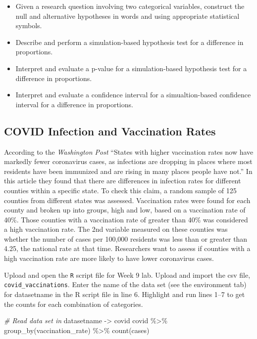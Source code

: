 \documentclass[
]{report}
\newenvironment{Shaded}{\begin{snugshade}}{\end{snugshade}}
\newcommand{\CommentTok}[1]{\textcolor[rgb]{0.56,0.35,0.01}{\textit{#1}}}
\newcommand{\FunctionTok}[1]{\textcolor[rgb]{0.00,0.00,0.00}{#1}}
\newcommand{\NormalTok}[1]{#1}
\newcommand{\OtherTok}[1]{\textcolor[rgb]{0.56,0.35,0.01}{#1}}
\newcommand{\SpecialCharTok}[1]{\textcolor[rgb]{0.00,0.00,0.00}{#1}}
\begin{document}
\begin{itemize}
\item
  Given a research question involving two categorical variables, construct the null and alternative hypotheses
  in words and using appropriate statistical symbols.
\item
  Describe and perform a simulation-based hypothesis test for a difference in proportions.
\item
  Interpret and evaluate a p-value for a simulation-based hypothesis test for a difference in proportions.
\item
  Interpret and evaluate a confidence interval for a simualtion-based confidence interval for a difference in proportions.
\end{itemize}

\hypertarget{covid-infection-and-vaccination-rates}{%
\subsection{COVID Infection and Vaccination Rates}\label{covid-infection-and-vaccination-rates}}

According to the \emph{Washington Post} ``States with higher vaccination rates now have markedly fewer coronavirus cases, as infections are dropping in places where most residents have been immunized and are rising in many places people have not.'' In this article they found that there are differences in infection rates for different counties within a specific state. To check this claim, a random sample of 125 counties from different states was assessed. Vaccination rates were found for each county and broken up into groups, high and low, based on a vaccination rate of 40\%. Those counties with a vaccination rate of greater than 40\% was considered a high vaccination rate. The 2nd variable measured on these counties was whether the number of cases per 100,000 residents was less than or greater than 4.25, the national rate at that time. Researchers want to assess if counties with a high vaccination rate are more likely to have lower coronavirus cases.

Upload and open the \texttt{R} script file for Week 9 lab. Upload and import the csv file, \texttt{covid\_vaccinations}. Enter the name of the data set (see the environment tab) for datasetname in the R script file in line 6. Highlight and run lines 1--7 to get the counts for each combination of categories.

\begin{Shaded}
\begin{Highlighting}[]
\CommentTok{\# Read data set in}
\NormalTok{datasetname }\OtherTok{{-}\textgreater{}}\NormalTok{ covid}
\NormalTok{covid }\SpecialCharTok{\%\textgreater{}\%} \FunctionTok{group\_by}\NormalTok{(vaccination\_rate) }\SpecialCharTok{\%\textgreater{}\%} \FunctionTok{count}\NormalTok{(cases)}
\end{Highlighting}
\end{Shaded}
\end{document}
